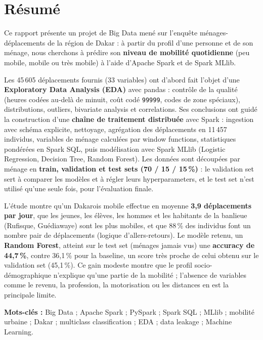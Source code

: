 \documentclass[12pt,a4paper]{report}
\newcommand{\code}[1]{\texttt{\small #1}}
\newcommand{\1}{\mathbf{1}}
\begin{document}
\chapter*{Résumé}

\begin{infobox}
Ce rapport présente un projet de Big Data mené sur l'enquête ménages-déplacements de la région de Dakar : à partir du profil d'une personne et de son ménage, nous cherchons à prédire son \textbf{niveau de mobilité quotidienne} (peu mobile, mobile ou très mobile) à l'aide d'Apache Spark et de Spark MLlib.
\end{infobox}

Les 45\,605 déplacements fournis (33 variables) ont d'abord fait l'objet d'une \textbf{Exploratory Data Analysis (EDA)} avec pandas : contrôle de la qualité (heures codées au-delà de minuit, coût codé \code{99999}, codes de zone spéciaux), distributions, outliers, bivariate analysis et correlations. Ses conclusions ont guidé la construction d'une \textbf{chaîne de traitement distribuée} avec Spark : ingestion avec schéma explicite, nettoyage, agrégation des déplacements en 11\,457 individus, variables de ménage calculées par window functions, statistiques pondérées en Spark SQL, puis modélisation avec Spark MLlib (Logistic Regression, Decision Tree, Random Forest). Les données sont découpées par ménage en \textbf{train, validation et test sets (70 / 15 / 15\,\%)} : le validation set sert à comparer les modèles et à régler leurs hyperparameters, et le test set n'est utilisé qu'une seule fois, pour l'évaluation finale.

L'étude montre qu'un Dakarois mobile effectue en moyenne \textbf{3,9 déplacements par jour}, que les jeunes, les élèves, les hommes et les habitants de la banlieue (Rufisque, Guédiawaye) sont les plus mobiles, et que 88\,\% des individus font un nombre pair de déplacements (logique d'allers-retours). Le modèle retenu, un \textbf{Random Forest}, atteint sur le test set (ménages jamais vus) une \textbf{accuracy de 44,7\,\%}, contre 36,1\,\% pour la baseline, un score très proche de celui obtenu sur le validation set (45,1\,\%). Ce gain modeste montre que le profil socio-démographique n'explique qu'une partie de la mobilité ; l'absence de variables comme le revenu, la profession, la motorisation ou les distances en est la principale limite.

\vspace{0.35cm}
\noindent\textbf{Mots-clés :} Big Data ; Apache Spark ; PySpark ; Spark SQL ; MLlib ; mobilité urbaine ; Dakar ; multiclass classification ; EDA ; data leakage ; Machine Learning.
\end{document}
